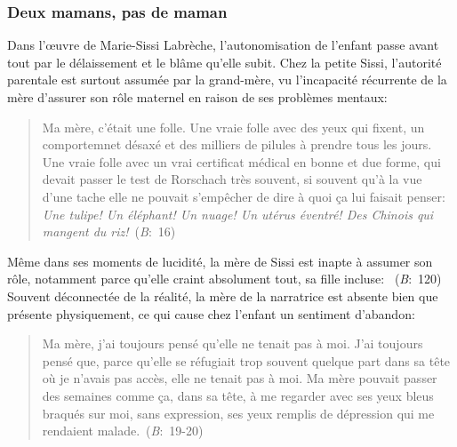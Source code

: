 \subsubsection{Deux mamans, pas de maman}
Dans l'\oe{}uvre de Marie-Sissi Labrèche, l'autonomisation de l'enfant passe avant tout par le délaissement et le blâme qu'elle subit.
Chez la petite Sissi, l'autorité parentale est surtout assumée par la grand-mère, vu l'incapacité récurrente de la mère d'assurer son rôle maternel en raison de ses problèmes mentaux:
\begin{quote}
  \begin{singlespace}
    \small
    Ma mère, c'était une folle. Une vraie folle avec des yeux qui fixent, un comportemnet désaxé et des milliers de pilules à prendre tous les jours. Une vraie folle avec un vrai certificat médical en bonne et due forme, qui devait passer le test de Rorschach très souvent, si souvent qu'à la vue d'une tache elle ne pouvait s'empêcher de dire à quoi ça lui faisait penser: \textit{Une tulipe! Un éléphant! Un nuage! Un utérus éventré! Des Chinois qui mangent du riz!}~(\textit{B}:~16)
    \normalsize
  \end{singlespace}
\end{quote}
Même dans ses moments de lucidité, la mère de Sissi est inapte à assumer son rôle, notamment parce qu'elle craint absolument tout, sa fille incluse: ~(\textit{B}:~120)
Souvent déconnectée de la réalité, la mère de la narratrice est absente bien que présente physiquement, ce qui cause chez l'enfant un sentiment d'abandon:
\begin{quote}
  \begin{singlespace}
    \small
    Ma mère, j'ai toujours pensé qu'elle ne tenait pas à moi. J'ai toujours pensé que, parce qu'elle se réfugiait trop souvent quelque part dans sa tête où je n'avais pas accès, elle ne tenait pas à moi. Ma mère pouvait passer des semaines comme ça, dans sa tête, à me regarder avec ses yeux bleus braqués sur moi, sans expression, ses yeux remplis de dépression qui me rendaient malade.~(\textit{B}:~19-20)
    \normalsize
  \end{singlespace}
\end{quote}
